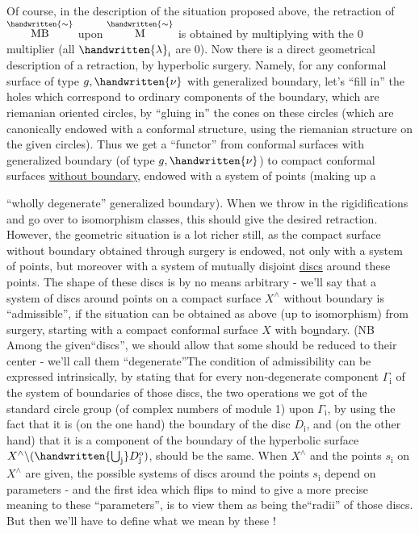 Of course, in the description of the situation proposed above, the retraction of $\overset{\handwritten{\sim}}{\mathrm{MB}}$ upon $\overset{\handwritten{\sim}}{\mathrm M}$ is obtained by multiplying with the 0 multiplier (all $\handwritten{\lambda}_{\mathrm i}$ are 0). Now there is a direct geometrical description of  a retraction, by hyperbolic surgery. Namely, for any  conformal surface of type $g,\handwritten{\nu}$ with generalized boundary, let's ``fill in'' the holes which correspond to ordinary components of the boundary, which are riemanian oriented circles, by ``gluing in'' the cones on these circles (which are canonically endowed with a conformal structure, using the riemanian structure on the given circles). Thus we get a ``functor'' from  conformal surfaces with generalized boundary (of type $g,\handwritten{\nu}$) to compact conformal surfaces \uline{without boundary}, endowed with a system of \handwritten{$\nu$} points (making up a


``wholly degenerate'' generalized boundary). When we throw in the rigidifications and go over to isomorphism classes, this should give the desired retraction. However, the geometric situation is a lot richer still, as the compact surface without boundary obtained through surgery is endowed, not only with a system of \handwritten{$\nu$} points, but moreover with a system of mutually disjoint \uline{discs} around these points. The shape of these discs is by no means arbitrary - we'll say that a system of discs around \handwritten{$\nu$} points on a compact  surface $X^{\wedge}$ without boundary is ``admissible'', if the situation can be obtained as above (up to isomorphism) from surgery, starting with a compact conformal surface $X$ with bo\uline{u}ndary. (NB Among the given``discs'', we should allow that some should be reduced to their center - we'll call them ``degenerate''\handwritten{)}The condition of admissibility can be expressed intrinsically, by stating that  for every non-degenerate component $\Gamma_{\mathrm i}$ of the system of boundaries of those discs, the two operations we got of the standard circle group (of complex numbers of module 1) upon $\Gamma_{\mathrm i}$, by using the fact that it is (on the one hand) the boundary of the disc $D_{\mathrm i}$, and (on the other hand) that it is a component of the boundary of the hyperbolic surface $X^\wedge\backslash(\handwritten{\bigcup_{\mathrm j}}D^{\mathrm o}_{\mathrm j})$, should be the same. \margin{\handwritten{!}} When $X^\wedge$ and the points $s_{\mathrm i}$ on $X^\wedge$ are given, the possible  systems of discs around the points $s_{\mathrm i}$ depend on \handwritten{$\nu$} parameters - and the first idea which flips to mind to give a more precise meaning to these ``parameters'', is to view them as being the``radii'' of those discs. But then we'll have to define what we mean by these !

